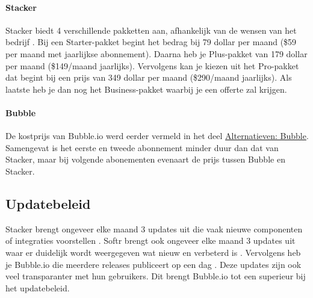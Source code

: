 \paragraph{Stacker}
Stacker biedt 4 verschillende pakketten aan, afhankelijk van de wensen van het bedrijf \autocite{JDN2023}
\autocite{Advice}. 
Bij een Starter-pakket begint het bedrag bij 79 dollar per maand (\$59 per maand met jaarlijkse abonnement).  
Daarna heb je Plus-pakket van 179 dollar per maand (\$149/maand jaarlijks). Vervolgens kan je kiezen uit het Pro-pakket 
dat begint bij een prijs van 349 dollar per maand (\$290/maand jaarlijks). Als laatste heb je dan nog het Business-pakket waarbij je een offerte zal krijgen.

\paragraph{Bubble}
De kostprijs van Bubble.io werd eerder vermeld in het deel \hyperref[subsec:bubble]{Alternatieven: Bubble}. 
Samengevat is het eerste en tweede abonnement minder duur dan dat van Stacker, maar bij volgende abonementen evenaart de prijs tussen Bubble en Stacker.
\subsection{Updatebeleid}%
\label{subsec:updatebeleid}
Stacker brengt ongeveer elke maand 3 updates uit die vaak nieuwe componenten of integraties voorstellen \autocite{Stacker}.  
Softr brengt ook ongeveer elke maand 3 updates uit waar er duidelijk wordt weergegeven wat nieuw en verbeterd is \autocite{Softra}. 
Vervolgens heb je Bubble.io die meerdere releases publiceert op een dag \autocite{Bubble}. Deze updates zijn ook veel transparanter met hun gebruikers. 
Dit brengt Bubble.io tot een superieur bij het updatebeleid.